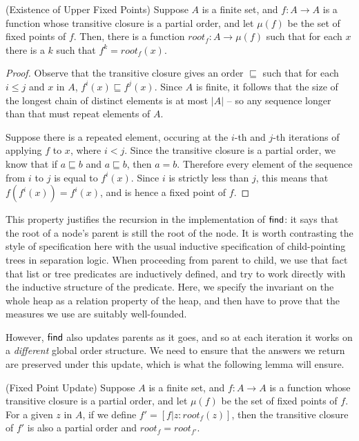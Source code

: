 \begin{lemma}{(Existence of Upper Fixed Points)}
Suppose $A$ is a finite set, and $f : A \to A$ is a function whose
transitive closure is a partial order, and let $\mu(f)$ be the
set of fixed points of $f$. Then, there is a function 
$\mathit{root}_f : A \to \mu(f)$ such that for each $x$ there is a 
$k$ such that $f^{k} = \mathit{root}_f(x)$.
\end{lemma}

\begin{proof}
Observe that the transitive closure gives an order $\sqsubseteq$ such
that for each $i \leq j$ and $x$ in $A$, $f^i(x) \sqsubseteq
f^j(x)$. Since $A$ is finite, it follows that the size of the longest
chain of distinct elements is at most $|A|$ -- so any sequence longer
than that must repeat elements of $A$.

Suppose there is a repeated element, occuring at the $i$-th and
$j$-th iterations of applying $f$ to $x$, where $i < j$. Since the
transitive closure is a partial order, we know that if $a \sqsubseteq
b$ and $a \sqsubseteq b$, then $a = b$. Therefore every element 
of the sequence from $i$ to $j$ is equal to $f^i(x)$. Since $i$ is
strictly less than $j$, this means that $f(f^i(x)) = f^i(x)$, and 
is hence a fixed point of $f$. 
\end{proof}

This property justifies the recursion in the implementation of
$\mathsf{find}$: it says that the root of a node's parent is still the root of
the node. It is worth contrasting the style of specification here with
the usual inductive specification of child-pointing trees in
separation logic. When proceeding from parent to child, we use that
fact that list or tree predicates are inductively defined, and try to
work directly with the inductive structure of the predicate.  Here, we
specify the invariant on the whole heap as a relation property of the
heap, and then have to prove that the measures we use are suitably
well-founded.


However, $\mathsf{find}$ also updates parents as it goes, and so at each
iteration it works on a \emph{different} global order structure.
We need to ensure that the answers we return are preserved under
this update, which is what the following lemma will ensure. 


\begin{lemma}{(Fixed Point Update)}
Suppose $A$ is a finite set, and $f : A \to A$ is a function whose
transitive closure is a partial order, and let $\mu(f)$ be the set of
fixed points of $f$. For a given $z$ in $A$, if we define $f' =
[f|z:\mathit{root}_f(z)]$, then the transitive closure of $f'$ is also
a partial order and $\mathit{root}_f = \mathit{root}_{f'}$.
\end{lemma}

